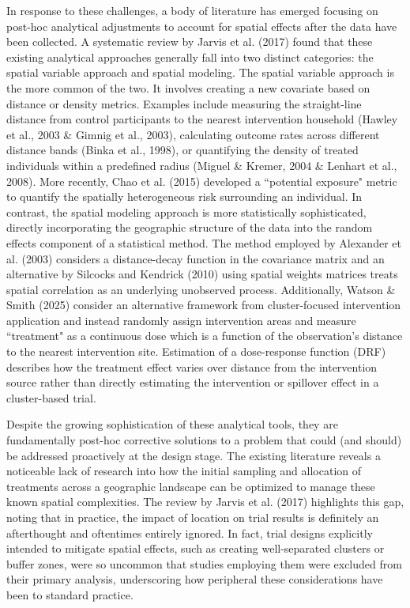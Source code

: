 \documentclass{article}[11pt]
\begin{document}
In response to these challenges, a body of literature has emerged focusing on post-hoc analytical adjustments to account for spatial effects after the data have been collected. A systematic review by Jarvis et al. (2017) found that these existing analytical approaches generally fall into two distinct categories: the spatial variable approach and spatial modeling\cite{jarvis_spatial_2017}. The spatial variable approach is the more common of the two. It involves creating a new covariate based on distance or density metrics. Examples include measuring the straight-line distance from control participants to the nearest intervention household (Hawley et al., 2003 \& Gimnig et al., 2003)\cite{hawley_community-wide_2003}\cite{gimnig_effect_2003}, calculating outcome rates across different distance bands (Binka et al., 1998)\cite{binka_impact_1998}, or quantifying the density of treated individuals within a predefined radius (Miguel \& Kremer, 2004 \& Lenhart et al., 2008)\cite{miguel_worms_2004}\cite{lenhart_insecticidetreated_2008}. More recently, Chao et al. (2015) developed a ``potential exposure" metric to quantify the spatially heterogeneous risk surrounding an individual\cite{chao_contribution_2015}. In contrast, the spatial modeling approach is more statistically sophisticated, directly incorporating the geographic structure of the data into the random effects component of a statistical method. The method employed by Alexander et al. (2003)\cite{alexander_spatial_2003} considers a distance-decay function in the covariance matrix and an alternative by Silcocks and Kendrick (2010)\cite{silcocks_spatial_2010} using spatial weights matrices treats spatial correlation as an underlying unobserved process. 
Additionally, Watson \& Smith (2025) consider an alternative framework from cluster-focused intervention application and instead randomly assign intervention areas and measure ``treatment" as a continuous dose which is a function of the observation's distance to the nearest intervention site\cite{watson_design_2025}. Estimation of a dose-response function (DRF) describes how the treatment effect varies over distance from the intervention source rather than directly estimating the intervention or spillover effect in a cluster-based trial.

Despite the growing sophistication of these analytical tools, they are fundamentally post-hoc corrective solutions to a problem that could (and should) be addressed proactively at the design stage. The existing literature reveals a noticeable lack of research into how the initial sampling and allocation of treatments across a geographic landscape can be optimized to manage these known spatial complexities. The review by Jarvis et al. (2017) highlights this gap, noting that in practice, the impact of location on trial results is definitely an afterthought and oftentimes entirely ignored\cite{jarvis_spatial_2017}. In fact, trial designs explicitly intended to mitigate spatial effects, such as creating well-separated clusters or buffer zones, were so uncommon that studies employing them were excluded from their primary analysis, underscoring how peripheral these considerations have been to standard practice\cite{jarvis_spatial_2017}. 
\end{document}
